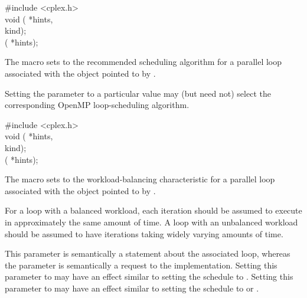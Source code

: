 \begin{ttfamily}
\#include <cplex.h>\\
void ( *hints,\\
\hspace*{2.5in} kind);\\
 ( *hints);
\end{ttfamily}

\pnum
The
macro sets to
the recommended scheduling algorithm
for a parallel loop associated with the object pointed to by
.

\begin{note}
Setting the
parameter to a particular value
may (but need not)
select the corresponding OpenMP loop-scheduling algorithm.
\end{note}

\begin{ttfamily}
\#include <cplex.h>\\
void ( *hints,\\
\hspace*{2.5in} kind);\\
 ( *hints);
\end{ttfamily}

\pnum
The
macro sets to
the workload-balancing characteristic
for a parallel loop associated with the object pointed to by
.

\pnum
For a loop with a balanced workload,
each iteration should be assumed to execute
in approximately the same amount of time.
A loop with an unbalanced workload
should be assumed to have iterations
taking widely varying amounts of time.

\begin{note}
This parameter is semantically a statement about the associated loop,
whereas the
parameter is semantically a request to the implementation.
Setting this parameter to
may have an effect similar to setting the schedule to
.
Setting this parameter to
may have an effect similar to setting the schedule to
or
.
\end{note}

